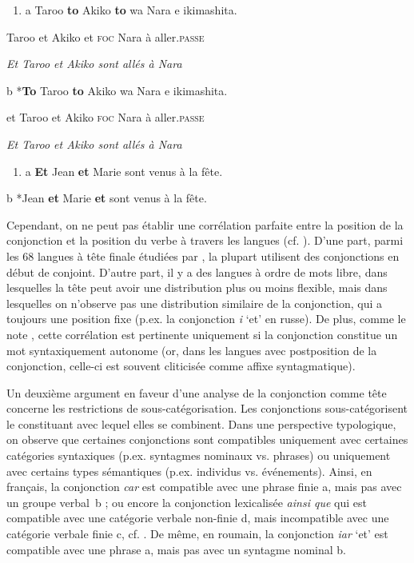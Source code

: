 \begin{enumerate}
\item \label{bkm:Ref301719480}a  Taroo  \textbf{to}  Akiko  \textbf{to}  wa  Nara  e  ikimashita.


\end{enumerate}
Taroo  et  Akiko  et  \textsc{foc } Nara  à  aller.\textsc{passe} 

{\itshape
Et Taroo et Akiko sont allés à Nara}

  b  *\textbf{To}  Taroo  \textbf{to}  Akiko  wa  Nara  e  ikimashita.

    et  Taroo  et  Akiko  \textsc{foc } Nara  à  aller.\textsc{passe}

    \textit{Et Taroo et Akiko sont allés à Nara} 


\begin{enumerate}
\item \label{bkm:Ref301719944}a  \textbf{Et} Jean \textbf{et} Marie sont venus à la fête.


\end{enumerate}
  b  *Jean \textbf{et} Marie \textbf{et} sont venus à la fête.

Cependant, on ne peut pas établir une corrélation parfaite entre la position de la conjonction et la position du verbe à travers les langues (cf. \citet{Chaves2007}). D'une part, parmi les 68 langues à tête finale étudiées par \citet{Zwart2005}, la plupart utilisent des conjonctions en début de conjoint. D'autre part, il y a des langues à ordre de mots libre, dans lesquelles la tête peut avoir une distribution plus ou moins flexible, mais dans lesquelles on n'observe pas une distribution similaire de la conjonction, qui a toujours une position fixe (p.ex. la conjonction \textit{i} `et' en russe). De plus, comme le note \citet{Mouret2007}, cette corrélation est pertinente uniquement si la conjonction constitue un mot syntaxiquement autonome (or, dans les langues avec postposition de la conjonction, celle-ci est souvent cliticisée comme affixe syntagmatique).

Un deuxième argument en faveur d'une analyse de la conjonction comme tête concerne les restrictions de sous-catégorisation. Les conjonctions sous-catégorisent le constituant avec lequel elles se combinent. Dans une perspective typologique, on observe que certaines conjonctions sont compatibles uniquement avec certaines catégories syntaxiques (p.ex. syntagmes nominaux vs. phrases) ou uniquement avec certains types sémantiques (p.ex. individus vs. événements). Ainsi, en français, la conjonction \textit{car} est compatible avec une phrase finie a, mais pas avec un groupe verbal~b ; ou encore la conjonction lexicalisée \textit{ainsi que} qui est compatible avec une catégorie verbale non-finie d, mais incompatible avec une catégorie verbale finie c, cf. \citet{Mouret2007}. De même, en roumain, la conjonction \textit{iar} `et' est compatible avec une phrase a, mais pas avec un syntagme nominal b.


